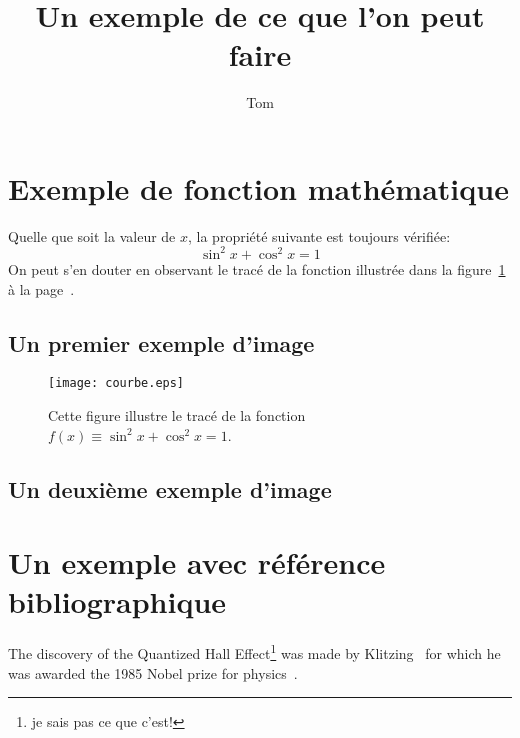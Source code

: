 \documentclass{article}           %
\title{Un exemple de ce que l'on peut faire}     %
\author{Tom}        %
\begin{document}

\maketitle                        %
\newpage
\tableofcontents                  %
\newpage
\section{Exemple de fonction mathématique}            %
Quelle que soit la valeur de $x$, 
la propriété suivante est toujours 
vérifiée: $$\sin^2 x+\cos^2 x=1$$ 
On peut s'en douter en observant 
le tracé de la fonction illustrée 
dans la figure~\ref{courbe} 
à la page~\pageref{courbe}.
\newpage
\subsection{Un premier exemple d'image}
\begin{figure}[htbp]
\centering
\texttt{[image: courbe.eps]}
\caption{Cette figure illustre 
le tracé de la fonction 
$f(x)\equiv\sin^2 x+\cos^2 x=1$.}
\label{courbe}
\end{figure}
\newpage
\subsection{Un deuxième exemple d'image}
\begin{figure}[htbp]
\centering
{}
\end{figure}

\section{Un exemple avec référence bibliographique}
The discovery of the Quantized Hall Effect\footnote{je sais pas ce que c'est!} was made by
Klitzing~\cite{qhe} for which he was awarded the 1985 Nobel
prize for physics~\cite{nobel}.
\end{document}
